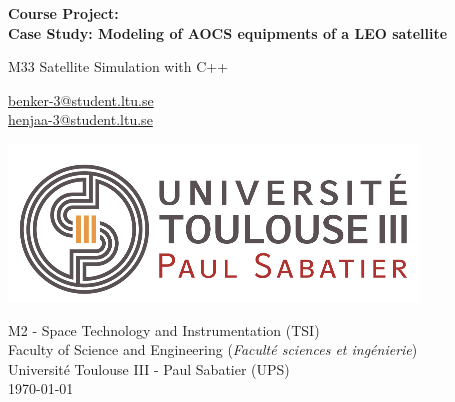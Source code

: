 \begin{titlepage}
    \begin{center}
    
        \vspace*{1cm}
        \Huge
        \textbf{
        Course Project: \\
        Case Study: Modeling of AOCS equipments of a LEO satellite
        }
            
        \vspace{0.5cm}
        \LARGE
        M33 Satellite Simulation with C++

            
        \vspace{2cm}
        \Large
        \begin{flushleft}
                \tab\url{benker-3@student.ltu.se} \\
              \tab\url{henjaa-3@student.ltu.se}          
            
        \end{flushleft}
            
        \vfill
            
        \includegraphics[width=0.5\linewidth]{Graphics/Vignette logo.png}
        \vfill
   
        
        \begin{flushleft}
            \large
            M2 - Space Technology and Instrumentation (TSI) \\
            Faculty of Science and Engineering (\textit{Faculté sciences et ingénierie}) \\
            Université Toulouse III - Paul Sabatier (UPS) \\
            \today
        \end{flushleft}
                   
            
    \end{center}
\end{titlepage}